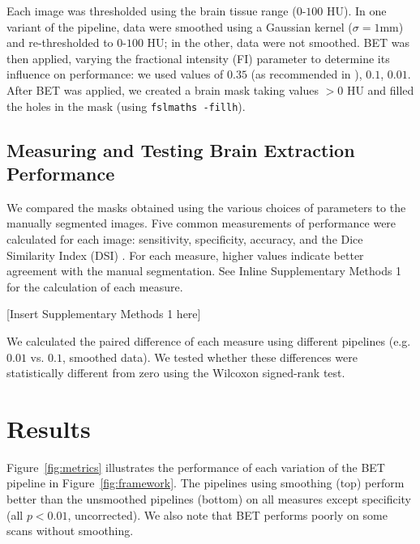 \documentclass{elsarticle}\usepackage[]{graphicx}\usepackage[]{color}
\begin{document}
Each image was thresholded using the brain tissue range ($0$-$100$ HU).  In one variant of the pipeline, data were smoothed using a Gaussian kernel ($\sigma=1$mm) and re-thresholded to $0$-$100$ HU; in the other, data were not smoothed.  BET was then applied, varying the fractional intensity (FI) parameter to determine its influence on performance: we used values of $0.35$ (as recommended in \citet{rorden_age-specific_2012}), $0.1$, $0.01$.  After BET was applied, we created a brain mask taking values $> 0$ HU and filled the holes in the mask (using \verb|fslmaths -fillh|).  



\subsection{Measuring and Testing Brain Extraction Performance}
We compared the masks obtained using the various choices of parameters to the manually segmented images.  Five common measurements of performance were calculated for each image: sensitivity, specificity, accuracy, and the Dice Similarity Index (DSI) \citep{dice_measures_1945}.  For each measure, higher values indicate better agreement with the manual segmentation.  See Inline Supplementary Methods 1 for the calculation of each measure.

[Insert Supplementary Methods 1 here]

We calculated the paired difference of each measure using different pipelines (e.g. $0.01$ vs. $0.1$, smoothed data).  We tested whether these differences were statistically different from zero using the Wilcoxon signed-rank test.






\section{Results}
Figure~\ref{fig:metrics}\protect{} illustrates the performance of each variation of the BET pipeline in Figure~\ref{fig:framework}.  The pipelines using smoothing (top) perform better than the unsmoothed pipelines (bottom) on all measures except specificity (all $p < 0.01$, uncorrected).  We also note that BET performs poorly on some scans without smoothing.  
\end{document}
